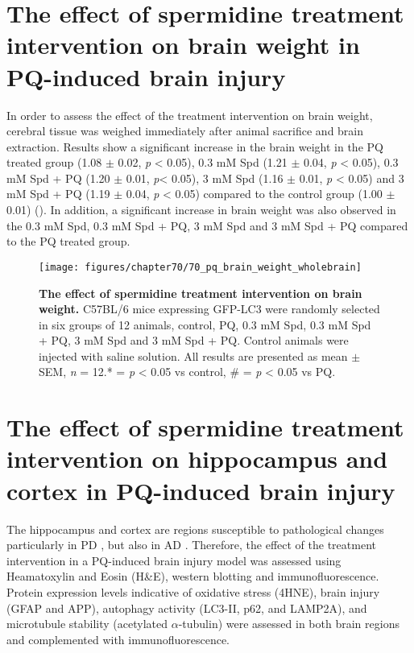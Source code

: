 \section{The effect of spermidine treatment intervention on brain weight in PQ-induced brain injury}
In order to assess the effect of the treatment intervention on brain weight, cerebral tissue was weighed immediately after animal sacrifice and brain extraction. Results show a significant increase in the brain weight in the PQ treated group (1.08 $\pm$ 0.02, \textit{p} < 0.05), 0.3 mM Spd (1.21 $\pm$ 0.04, \textit{p} < 0.05), 0.3 mM Spd + PQ (1.20 $\pm$ 0.01,  \textit{p}< 0.05), 3 mM Spd (1.16 $\pm$ 0.01, \textit{p} < 0.05) and 3 mM Spd + PQ (1.19 $\pm$ 0.04, \textit{p} < 0.05) compared to the control group (1.00 $\pm$ 0.01) (). In addition, a significant increase in brain weight was also observed in the 0.3 mM Spd, 0.3 mM Spd + PQ, 3 mM Spd and 3 mM Spd + PQ compared to the PQ treated group. 

\begin{figure}[!htbp]
\center
  \texttt{[image: figures/chapter70/70\_pq\_brain\_weight\_wholebrain]}
  \caption[The effect of spermidine treatment intervention on brain weight]{\textbf{The effect of spermidine treatment intervention on brain weight.} C57BL/6 mice expressing GFP-LC3 were randomly selected in six groups of 12 animals, control, PQ, 0.3 mM Spd, 0.3 mM Spd + PQ, 3 mM Spd and 3 mM Spd + PQ. Control animals were injected with saline solution. All results are presented as mean $\pm$ SEM, \textit{n} = 12.* = \textit{p} < 0.05 vs control, \# = \textit{p} < 0.05 vs PQ.}
  \label{fig:70_pq_brain_weight_wholebrain}
\end{figure} 

\section{The effect of spermidine treatment intervention on hippocampus and cortex in PQ-induced brain injury}
The hippocampus and cortex are regions susceptible to pathological changes particularly in PD \citep{Braak2004, Braak1998}, but also in AD \citep{Braak2004,Braak1998,Braak1991,Braak2012}. Therefore, the effect of the treatment intervention in a PQ-induced brain injury model was assessed using Heamatoxylin and Eosin (H\&E), western blotting and immunofluorescence. Protein expression levels indicative of oxidative stress (4HNE), brain injury (GFAP and APP), autophagy activity (LC3-II, p62, and LAMP2A), and microtubule stability (acetylated $\alpha$-tubulin) were assessed in both brain regions and complemented with immunofluorescence.

